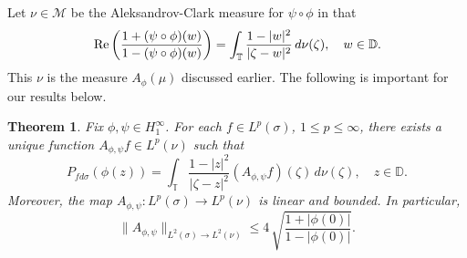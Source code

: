 \documentclass[11pt]{amsart}
\def\D{\mathbb{D}}
\def\T{\mathbb{T}}
\renewcommand{\leq}{\leqslant}
\renewcommand{\Re}{\mathop{\rm Re}}
\numberwithin{equation}{section}
\theoremstyle{plain}
\newtheorem{theorem}[equation]{Theorem}
\theoremstyle{definition}
\begin{document}
Let $\nu \in \mathcal{M}$ be the Aleksandrov-Clark measure for $\psi \circ \phi$ in that
\begin{equation}\label{eq:AC2}
	\Re\left(\frac{1+(\psi \circ \phi)(w)}{1-(\psi \circ \phi)(w)}\right)=\int_{\T}\frac{1-|w|^2}{|\zeta-w|^2}\, d\nu(\zeta), \quad w \in \D.
\end{equation}
This $\nu$ is the measure $A_\phi(\mu)$ discussed earlier. 
The following is important for our results below. 

\begin{theorem}\label{th:Aleksandrov} Fix $\phi, \psi \in H^{\infty}_{1}$. For each $f\in L^p(\sigma)$, $1\leq p\leq \infty$, there exists a unique function $A_{\phi, \psi} f\in L^p(\nu)$ such that 
	\begin{equation}\label{eq:AC3}
		P_{fd\sigma}(\phi(z))=\int_{\T} \frac{1-|z|^2}{|\zeta-z|^2}(A_{\phi, \psi} f)(\zeta)\,d\nu(\zeta), \quad z \in \D.
	\end{equation}
	Moreover, the map $A_{\phi, \psi}: L^p(\sigma)\to L^p(\nu)$ is linear and bounded. In particular, 
	\begin{equation}\label{eq:L2norm}
		\|A_{\phi, \psi}\|_{L^2(\sigma) \to L^2(\nu)} \leq 4\,\sqrt{\frac{1+|\phi(0)|}{1-|\phi(0)|}}.
	\end{equation}
\end{theorem}
\end{document}
